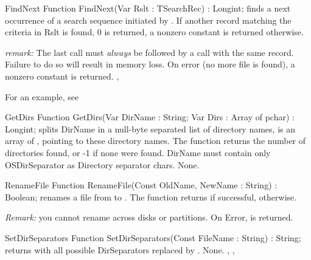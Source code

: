 

\begin{function}{FindNext}
\Declaration
Function FindNext(Var Rslt : TSearchRec) : Longint;
\Description
{} finds a next occurrence of a search sequence initiated by
. If another record matching the criteria in Rslt is found, 0
is returned, a nonzero constant is returned otherwise.

{\em remark:} The last  call must {\em always} be followed by a
 call with the same  record. Failure to do so will
result in memory loss.
\Errors
On error (no more file is found), a nonzero constant is returned.
\SeeAlso
{}, 
\end{function}

For an example, see 
 
\begin{function}{GetDirs}
\Declaration
Function GetDirs(Var DirName : String; Var Dirs : Array of pchar) : Longint; 
\Description
{} splits DirName in a null-byte separated list of directory names,
 is an array of , pointing to these directory names.
The function returns the number of directories found, or -1 if none were found.
DirName must contain only OSDirSeparator as Directory separator chars.
\Errors
None.
\SeeAlso
{}
\end{function}


 
\begin{function}{RenameFile}
\Declaration
Function RenameFile(Const OldName, NewName : String) : Boolean;
\Description
{} renames a file from  to . The
function returns  if successful,  otherwise.

{\em Remark:} you cannot rename across disks or partitions. 
\Errors
On Error,  is returned.
\SeeAlso
{}
\end{function}



\begin{function}{SetDirSeparators}
\Declaration
Function SetDirSeparators(Const FileName : String) : String;
\Description
{} returns  with all possible
DirSeparators replaced by .
\Errors
None.
\SeeAlso
{}, , 
\end{function}

